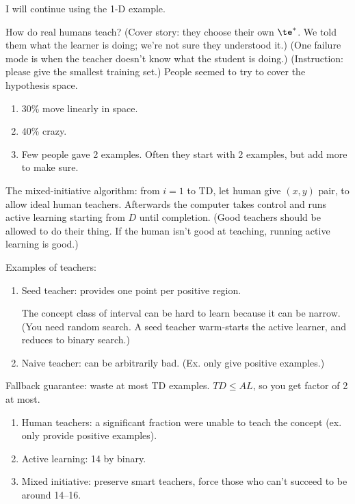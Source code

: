 I will continue using the 1-D example.

How do real humans teach? (Cover story: they choose their own $\te^*$. We told them what the learner is doing; we're not sure they understood it.) (One failure mode is when the teacher doesn't know what the student is doing.) (Instruction: please give the smallest training set.) People seemed to try to cover the hypothesis space.
\begin{enumerate}
\item
30\% move linearly in space.
\item
40\% crazy.
\item
Few people gave 2 examples.
Often they start with 2 examples, but add more to make sure.
\end{enumerate}

The mixed-initiative algorithm: from $i=1$ to TD, let human give $(x,y)$ pair, to allow ideal human teachers.
Afterwards the computer takes control and runs active learning starting from $D$ until completion.
(Good teachers should be allowed to do their thing. If the human isn't good at teaching, running active learning is good.)

Examples of teachers:
\begin{enumerate}
\item
Seed teacher: provides one point per positive region.

The concept class of interval can be hard to learn because it can be narrow. (You need random search. A seed teacher warm-starts the active learner, and reduces to binary search.)
\item
Naive teacher: can be arbitrarily bad. (Ex. only give positive examples.)
\end{enumerate}
Fallback guarantee: waste at most TD examples. $TD\le AL$, so you get factor of 2 at most.

\begin{enumerate}
\item
Human teachers: a significant fraction were unable to teach the concept (ex. only provide positive examples).
\item
Active learning: 14 by binary.
\item
Mixed initiative: preserve smart teachers, force those who can't succeed to be around 14--16.
\end{enumerate}

